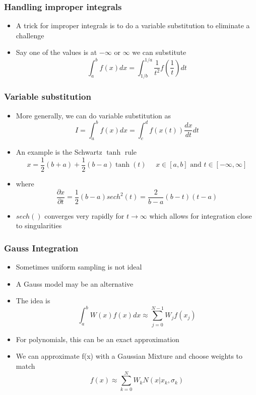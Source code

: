 \documentclass[10pt]{beamer}
\begin{document}
\begin{frame}
  \frametitle{Handling improper integrals}
  \begin{itemize}
  \item A trick for improper integrals is to do a variable substitution to eliminate a challenge
  \item Say one of the values is at $-\infty$ or $\infty$ we can substitute
    \[
      \int_a^b f(x) dx = \int_{1/b}^{1/a} \frac{1}{t^2} f\left( \frac{1}{t} \right) dt
    \]
  \end{itemize}
\end{frame}

\begin{frame}
  \frametitle{Variable substitution}
  \begin{itemize}
  \item More generally, we can do variable substitution as
    \[
      I = \int_a^b f(x) dx = \int_c^d f(x(t)) \frac{dx}{dt} dt
    \]
  \item An example is the Schwartz $\tanh$ rule
    \[
      x = \frac{1}{2} (b+a) + \frac{1}{2} (b-a) \tanh(t) \mbox{~~~ } x\in[a,b] \mbox{ and } t\in[-\infty,\infty]
    \]
  \item where
    \[
      \frac{\partial x}{\partial t} = \frac{1}{2} (b-a) sech^2(t) = \frac{2}{b-a} (b-t) (t-a)
    \]
  \item $sech()$ converges very rapidly for $t\rightarrow \infty$ which allows for integration close to singularities
  \end{itemize}
\end{frame}

\begin{frame}
  \frametitle{Gauss Integration}
  \begin{itemize}
  \item Sometimes uniform sampling is not ideal
  \item A Gauss model may be an alternative
  \item The idea is
    \[
      \int_a^b W(x) f(x) dx \approx \sum_{j=0}^{N-1} W_j f(x_j)
    \]
  \item For polynomials, this can be an exact approximation
  \item We can approximate f(x) with a Gaussian Mixture and choose weights to match
    \[
      f(x) \approx \sum_{k=0}^N W_k N(x | x_k, \sigma_k)
    \]
  \end{itemize}
\end{frame}
\end{document}
